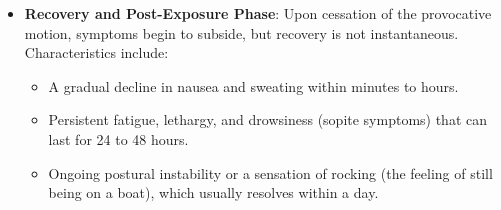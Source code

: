 \begin{itemize}
\begin{itemize}
    \end{itemize}
    \item \textbf{Recovery and Post-Exposure Phase}: Upon cessation of the provocative motion, symptoms begin to subside, but recovery is not instantaneous. Characteristics include:
    \begin{itemize}
        \item A gradual decline in nausea and sweating within minutes to hours.
        \item Persistent fatigue, lethargy, and drowsiness (sopite symptoms) that can last for 24 to 48 hours.
        \item Ongoing postural instability or a sensation of rocking (the feeling of still being on a boat), which usually resolves within a day.
    \end{itemize}
\end{itemize}

